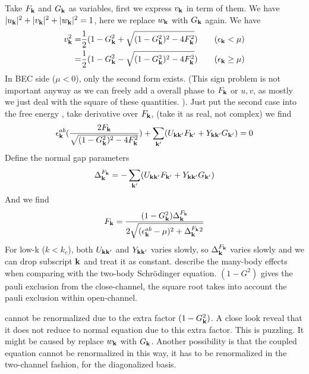 Take $F_{\mathbf{k}}$ and $G_{\mathbf{k}}$ as variables, first we express $v_{\mathbf{k}}$ in term of them.  We have  $\lvert{u_{\ensuremath{\mathbf{k}}}}\rvert^2+\lvert{v_{\ensuremath{\mathbf{k}}}}\rvert^2+\lvert{w_{\ensuremath{\mathbf{k}}}}\rvert^2=1$, here we replace  $w_{\mathbf{k}}$  with  $G_{\mathbf{k}}$  again.  We have 
\[
\begin{split}
v_{\mathbf{k}}^2=&\frac{1}{2}(1-G_{\mathbf{k}}^{2}+\sqrt{(1-G_{\mathbf{k}}^{2})^{2}-4F_{\mathbf{k}}^{2}})\qquad (\epsilon_{\mathbf{k}}<\mu)\\
	=&\frac{1}{2}(1-G_{\mathbf{k}}^{2}-\sqrt{(1-G_{\mathbf{k}}^{2})^{2}-4F_{\mathbf{k}}^{2}})\qquad (\epsilon_{\mathbf{k}}\geq\mu)
\end{split}
\]
In BEC side ($\mu<0$), only the second form exists. (This sign problem is not important anyway as we can freely add a overall phase to $F_{\mathbf{k}}$ or $u,v$, as mostly we just deal with the square of these quantities. ).   Just put the second case into the free energy , take derivative over $F_{\mathbf{k}}$, (take it as real, not complex) we find 
\begin{equation}\label{eq:20100909:fEq}
\epsilon^{ab}_{\mathbf{k}}(\frac{2F_{\mathbf{k}}}{\sqrt{(1-G_{\mathbf{k}}^{2})^{2}-4F_{\mathbf{k}}^{2}}})+\sum_{\mathbf{k}'}(U_{\mathbf{k}\mathbf{k}'}F_{\mathbf{k}'}+Y_{\mathbf{k}\mathbf{k}'}G_{\mathbf{k}'})=0
\end{equation}
Define the normal gap parameters 
\begin{equation}\label{eq:20100909:gap}
\Delta^{F_{\mathbf{k}}}_{\mathbf{k}}=-\sum_{\mathbf{k}'}(U_{\mathbf{k}\mathbf{k}'}F_{\mathbf{k}'}+Y_{\mathbf{k}\mathbf{k}'}G_{\mathbf{k}'})
\end{equation}
And we find
\begin{equation}
F_{\mathbf{k}}=\frac{(1-G_{\mathbf{k}}^{2})\Delta^{F_{\mathbf{k}}}_{\mathbf{k}}}{2\sqrt{(\epsilon^{ab}_{\mathbf{k}}-\mu)^{2}+\Delta^{F_{\mathbf{k}}}_{\mathbf{k}}{}^{2}}}
\end{equation}
For low-k ($k<k_{c}$), both $U_{\mathbf{k}\mathbf{k}'}$ and $Y_{\mathbf{k}\mathbf{k}'}$ varies slowly, so $\Delta^{F_{\mathbf{k}}}_{\mathbf{k}}$ varies slowly and we can drop subscript $\mathbf{k}$ and treat it as constant.   describe the many-body effects when comparing with the two-body Schr\"{o}dinger equation.  $(1-G^{2})$ gives the pauli exclusion from the close-channel, the square root takes into account the pauli exclusion within open-channel.  

 cannot be renormalized due to the extra factor $(1-G_{\mathbf{k}}^{2})$.  A close look reveal that it does not reduce to normal \sch equation due to this extra factor.  This is puzzling.  It might be caused by replace $w_{\mathbf{k}}$ with $G_{\mathbf{k}}$.  Another possibility is that the coupled equation cannot be renormalized in this way, it has to be renormalized in the two-channel fashion, for the diagonalized  basis.  


